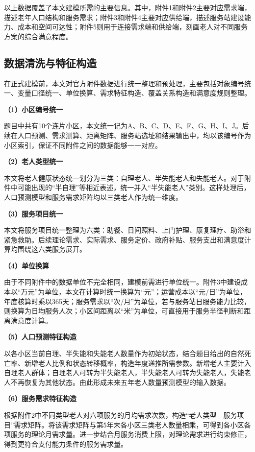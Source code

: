\documentclass[UTF8]{ctexart}
\begin{document}
以上数据覆盖了本文建模所需的主要信息。其中，附件1和附件2主要对应需求端，描述老年人口结构和服务需求；附件3和附件4主要对应供给端，描述服务站建设能力、成本和空间可达性；附件5则用于连接需求端和供给端，刻画老人对不同服务方案的综合满意程度。

\subsection{数据清洗与特征构造}

在正式建模前，本文对官方附件数据进行统一整理和预处理，主要包括对象编号统一、变量口径统一、单位换算、需求特征构造、覆盖关系构造和满意度规则整理。

\textbf{（1）小区编号统一}

题目中共有10个连片小区，本文统一记为A、B、C、D、E、F、G、H、I、J。后续在人口预测、需求测算、距离矩阵、服务站选址和结果输出中，均以该编号作为小区索引，保证不同附件之间的数据能够一一对应。

\textbf{（2）老人类型统一}

本文将老人健康状态统一划分为三类：自理老人、半失能老人和失能老人。对于附件中可能出现的“半自理”等相近表述，统一并入“半失能老人”类别。这样处理后，人口预测模型和服务需求矩阵均以三类老人作为统一维度。

\textbf{（3）服务项目统一}

本文将服务项目统一整理为六类：助餐、日间照料、上门护理、康复理疗、助浴和紧急救助。后续理论需求、实际需求、服务定价、政府补贴、服务支出和满意度计算均围绕这六类服务展开。

\textbf{（4）单位换算}

由于不同附件中的数据单位不完全相同，建模前需进行单位统一。附件3中建设成本以“万元”为单位，本文在计算时统一换算为“元”；运营成本以“元/日”为单位，年度核算时乘以365天；服务需求以“次/月”为单位，若与服务站日服务能力比较，则换算为日均服务人次；小区间距离以“米”为单位，可直接用于服务半径判断和距离满意度计算。

\textbf{（5）人口预测特征构造}

以各小区当前自理、半失能和失能老人数量作为初始状态，结合题目给出的自然死亡率、新增老人比例和状态转移概率，构造年度递推所需参数。新增老人主要计入自理老人群体；自理老人可转为半失能老人，半失能老人可转为失能老人，失能老人不再恢复为其他状态。由此形成未来五年老人数量预测模型的输入数据。

\textbf{（6）服务需求特征构造}

根据附件2中不同类型老人对六项服务的月均需求次数，构造“老人类型—服务项目”需求矩阵。将该需求矩阵与第5年末各小区三类老人数量相乘，可得到各小区各项服务的理论月需求量。进一步结合月服务消费上限，对理论需求进行约束修正，得到更符合支付能力条件的服务需求量。
\end{document}
